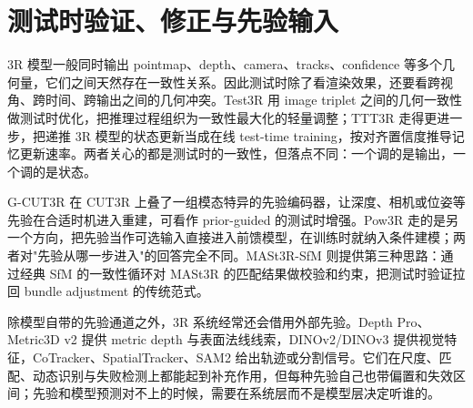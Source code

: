 \documentclass[UTF8,a4paper,zihao=-4,fontset=windows]{ctexart}
\begin{document}
\section{测试时验证、修正与先验输入}

3R 模型一般同时输出 pointmap、depth、camera、tracks、confidence 等多个几何量，它们之间天然存在一致性关系。因此测试时除了看渲染效果，还要看跨视角、跨时间、跨输出之间的几何冲突。Test3R 用 image triplet 之间的几何一致性做测试时优化，把推理过程组织为一致性最大化的轻量调整\citep{test3r}；TTT3R 走得更进一步，把递推 3R 模型的状态更新当成在线 test-time training，按对齐置信度推导记忆更新速率\citep{ttt3r}。两者关心的都是测试时的一致性，但落点不同：一个调的是输出，一个调的是状态。

G-CUT3R 在 CUT3R 上叠了一组模态特异的先验编码器，让深度、相机或位姿等先验在合适时机进入重建，可看作 prior-guided 的测试时增强\citep{gcut3r}。Pow3R 走的是另一个方向，把先验当作可选输入直接进入前馈模型，在训练时就纳入条件建模；两者对"先验从哪一步进入"的回答完全不同\citep{pow3r}。MASt3R-SfM 则提供第三种思路：通过经典 SfM 的一致性循环对 MASt3R 的匹配结果做校验和约束，把测试时验证拉回 bundle adjustment 的传统范式\citep{mast3r_sfm}。

除模型自带的先验通道之外，3R 系统经常还会借用外部先验。Depth Pro、Metric3D v2 提供 metric depth 与表面法线线索，DINOv2/DINOv3 提供视觉特征，CoTracker、SpatialTracker、SAM2 给出轨迹或分割信号\citep{depth_pro,metric3dv2,dinov2,dinov3,cotracker,spatialtracker,sam2}。它们在尺度、匹配、动态识别与失败检测上都能起到补充作用，但每种先验自己也带偏置和失效区间；先验和模型预测对不上的时候，需要在系统层而不是模型层决定听谁的。
\end{document}
